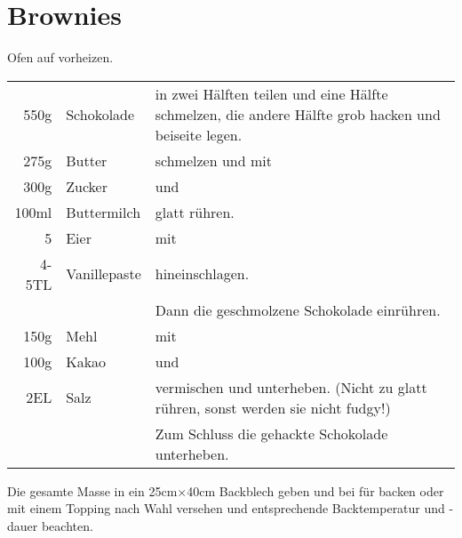 \section{Brownies}
Ofen auf  vorheizen.\\

\begin{longtable}{rlL{17.3cm}}
	550g	&	Schokolade		&	in zwei Hälften teilen und eine Hälfte schmelzen, die andere Hälfte grob hacken und beiseite legen. \\
	275g	&	Butter			&	schmelzen und mit \\
	300g	&	Zucker			&	und \\
	100ml	&	Buttermilch		&	glatt rühren. \\
	5		&	Eier			&	mit \\
	4-5TL	&	Vanillepaste	&	hineinschlagen.\\
			&					&	Dann die geschmolzene Schokolade einrühren. \\
	150g	&	Mehl			&	mit \\
	100g	&	Kakao			&	und \\
	2EL		&	Salz			&	vermischen und unterheben. (Nicht zu glatt rühren, sonst werden sie nicht fudgy!)\\
			&					&	Zum Schluss die gehackte Schokolade unterheben. \\
\end{longtable}

Die gesamte Masse in ein 25cm$\times$40cm Backblech geben und bei  für  backen oder mit einem Topping nach Wahl versehen und entsprechende Backtemperatur und -dauer beachten.
